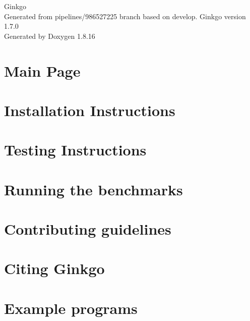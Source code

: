 \let\mypdfximage\pdfximage\def\pdfximage{\immediate\mypdfximage}\documentclass[twoside]{book}
\newcommand{\+}{\discretionary{\mbox{\scriptsize$\hookleftarrow$}}{}{}}
\newcommand{\clearemptydoublepage}{%
  \newpage{\pagestyle{empty}\cleardoublepage}%
}
\begin{document}
\hypersetup{pageanchor=false,
             bookmarksnumbered=true,
             pdfencoding=unicode
            }
\begin{titlepage}
\vspace*{7cm}
\begin{center}%
{\Large Ginkgo \\[1ex]\large Generated from pipelines/986527225 branch based on develop. Ginkgo version 1.\+7.\+0 }\\
\vspace*{1cm}
{\large Generated by Doxygen 1.8.16}\\
\end{center}
\end{titlepage}
\clearemptydoublepage
{}
\tableofcontents
\clearemptydoublepage
{}
\hypersetup{pageanchor=true}

\chapter{Main Page}
\label{index}\hypertarget{index}{}
\chapter{Installation Instructions}
\label{install_ginkgo}

\chapter{Testing Instructions}
\label{testing_ginkgo}

\chapter{Running the benchmarks}
\label{benchmarking_ginkgo}

\chapter{Contributing guidelines}
\label{contributing_guidelines}

\chapter{Citing Ginkgo}
\label{citing_ginkgo}

\chapter{Example programs}
\label{Examples}

\end{document}
